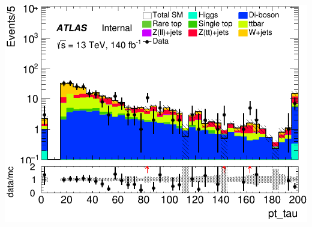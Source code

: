 \documentclass[usenames,dvipsnames]{beamer}
\begin{document}
\begin{frame}
\begin{minipage}{0.32\textwidth}
        \includegraphics[width=\textwidth]{graphics/LHH_met/LHH_met_pt_tau.png}
    \end{minipage}
    
    \vspace{0.5cm} %
\end{frame}
\end{document}

